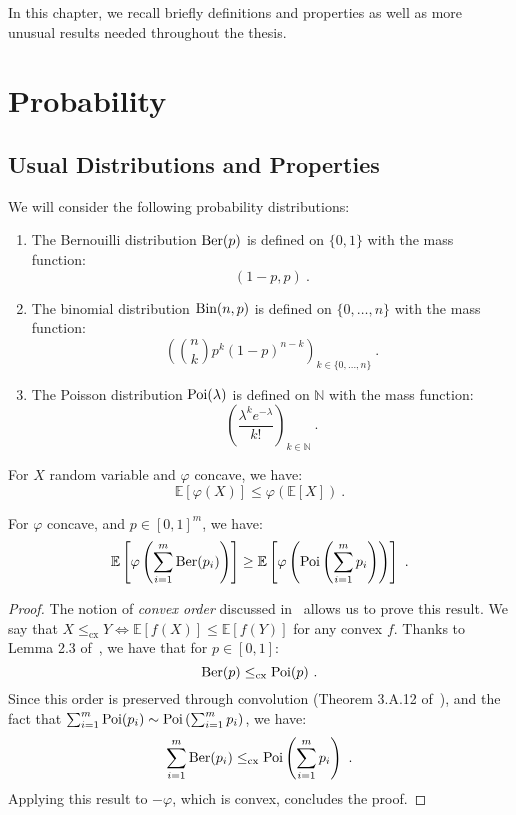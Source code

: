 In this chapter, we recall briefly definitions and properties as well as more unusual results needed throughout the thesis.

\section{Probability}
\subsection{Usual Distributions and Properties}
\begin{definition}
  We will consider the following probability distributions:
  \begin{enumerate}
  \item The Bernouilli distribution $\operatorname{\text{Ber}}(p)$ is defined on $\{0,1\}$ with the mass function:
        \[ (1-p,p) \ . \]
  \item The binomial distribution $\operatorname{\text{Bin}}(n,p)$ is defined on $\{0,\ldots,n\}$ with the mass function:
        \[ \left(\binom{n}{k}p^k(1-p)^{n-k}\right)_{k \in \{0,\ldots,n\}} \ .\]
  \item The Poisson distribution $\operatorname{\text{Poi}}(\lambda)$ is defined on $\mathbb{N}$ with the mass function:
        \[ \left(\frac{\lambda^ke^{-\lambda}}{k!}\right)_{k \in \mathbb{N}} \ .\]
  \end{enumerate}      
\end{definition}

\begin{proposition}
   For $X$ random variable and $\varphi$ concave, we have:
   \[ \mathbb{E}\left[\varphi(X)\right] \leq \varphi\left(\mathbb{E}[X]\right) \ . \]
\end{proposition}

\begin{proposition}
    For $\varphi$ concave, and $p \in [0,1]^m$, we have:
    \[\mathbb{E}\left[\varphi\left(\sum_{i=1}^m\operatorname{\text{Ber}}(p_i)\right)\right] \geq \mathbb{E}\left[\varphi\left(\operatorname{\text{Poi}}\left(\sum_{i=1}^m p_i\right)\right)\right]\ .\]
  \label{prop:ConvexOrder}
\end{proposition}

\begin{proof}
  The notion of \emph{convex order} discussed in~\cite{SS07} allows us to prove this result. We say that $X \leq_{\text{cx}} Y \iff \mathbb{E}[f(X)] \leq \mathbb{E}[f(Y)]$ for any convex $f$. Thanks to Lemma 2.3 of~\cite{BFGG20}, we have that for $p \in [0,1]$:
  \[\Ber(p) \leq_{\text{cx}} \Poi(p)\ .\]
  Since this order is preserved through convolution (Theorem 3.A.12 of~\cite{SS07}), and the fact that $\sum_{i=1}^m \operatorname{\text{Poi}}(p_i) \sim \operatorname{\text{Poi}}\left(\sum_{i=1}^m p_i\right)$, we have:
  \[\sum_{i=1}^m\operatorname{\text{Ber}}(p_i) \leq_{\text{cx}}  \operatorname{\text{Poi}}\left(\sum_{i=1}^m p_i\right)\ .\]
  Applying this result to $-\varphi$, which is convex, concludes the proof.
\end{proof}

